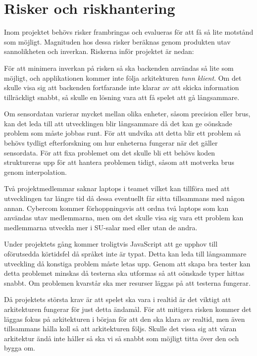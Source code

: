 \section{Risker och riskhantering}
Inom projektet behövs risker frambringas och evalueras för att få så lite motstånd som möjligt. 
Magnituden hos dessa risker beräknas genom produkten utav sannolikheten och inverkan.
Riskerna inför projektet är nedan:

{
    För att minimera inverkan på risken så ska backenden användas så lite som möjligt, och applikationen kommer inte följa arkitekturen \textit{tunn klient}.
    Om det skulle visa sig att backenden fortfarande inte klarar av att skicka information tillräckligt snabbt, 
    så skulle en lösning vara att få spelet att gå långsammare.
}

{
    Om sensordatan varierar mycket mellan olika enheter, såsom precision eller brus,
    kan det leda till att utvecklingen blir långsammare då det kan ge oönskade problem som måste jobbas runt.
    För att undvika att detta blir ett problem så behövs tydligt efterforskning om hur enheterna fungerar när
    det gäller sensordata. För att fixa problemet om det skulle bli ett behövs koden struktureras upp för att
    hantera problemen tidigt, såsom att motverka brus genom interpolation.
}

{
    Två projektmedlemmar saknar laptops i teamet vilket kan tillföra med att utvecklingen tar längre tid
    då dessa eventuellt får sitta tillsammans med någon annan.
    Cybercom kommer förhoppningsvis att ordna två laptops som kan användas utav medlemmarna, men om det skulle
    visa sig vara ett problem kan medlemmarna utveckla mer i SU-salar med eller utan de andra.
}

{
    Under projektets gång kommer troligtvis JavaScript att ge upphov till oförutsedda körtidsfel då språket inte är typat.
    Detta kan leda till långsammare utveckling då konstiga problem måste letas upp.
    Genom att skapa bra tester kan detta problemet minskas då testerna ska utformas så att oönskade typer hittas snabbt.
    Om problemen kvarstår ska mer resurser läggas på att testerna fungerar.
}

{
    Då projektets största krav är att spelet ska vara i realtid är det viktigt att arkitekturen fungerar för just
    detta ändamål.
    För att mitigera risken kommer det läggas fokus på arkitekturen i början för att den ska klara av realtid, 
    men även tillsammans hålla koll så att arkitekturen följs.
    Skulle det vissa sig att våran arkitektur ändå inte håller så ska vi så snabbt som möjligt titta över den och bygga om.
}

